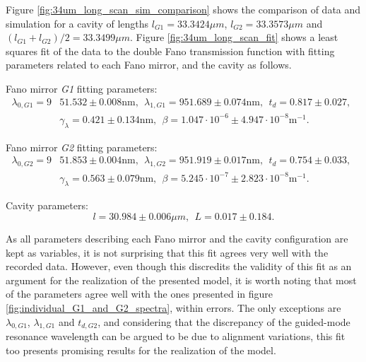 Figure \ref{fig:34um_long_scan_sim_comparison} shows the comparison of data and simulation for a cavity of lengths $l_{G1} = 33.3424 \mu m$, $l_{G2} = 33.3573 \mu m$ and $(l_{G1} + l_{G2})/2 = 33.3499 \mu m$. Figure \ref{fig:34um_long_scan_fit} shows a least squares fit of the data to the double Fano transmission function with fitting parameters related to each Fano mirror, and the cavity as follows.

Fano mirror \emph{G1} fitting parameters:
\begin{equation}
    \begin{split}
        \lambda_{0,G1} = 9&51.532 \pm 0.008 \text{nm}, \:\: \lambda_{1,G1} = 951.689 \pm 0.074 \text{nm}, \:\: t_d = 0.817 \pm 0.027, \:\: \\&\gamma_{\lambda} = 0.421 \pm 0.134 \text{nm}, \:\: \beta = 1.047 \cdot 10^{-6} \pm 4.947 \cdot 10^{-8} \text{m}^{-1}.
    \end{split}
\end{equation}

Fano mirror \emph{G2} fitting parameters:
\begin{equation}
    \begin{split}
        \lambda_{0,G2} = 9&51.853 \pm 0.004 \text{nm}, \:\: \lambda_{1,G2} = 951.919 \pm 0.017 \text{nm}, \:\: t_d = 0.754 \pm 0.033, \:\: \\&\gamma_{\lambda} = 0.563 \pm 0.079 \text{nm}, \:\: \beta = 5.245 \cdot 10^{-7} \pm 2.823 \cdot 10^{-8} \text{m}^{-1}.
    \end{split}
\end{equation}

Cavity parameters:
\begin{equation}
    l = 30.984 \pm 0.006 \mu m, \:\: L = 0.017 \pm 0.184.
\end{equation}

As all parameters describing each Fano mirror and the cavity configuration are kept as variables, it is not surprising that this fit agrees very well with the recorded data. However, even though this discredits the validity of this fit as an argument for the realization of the presented model, it is worth noting that most of the parameters agree well with the ones presented in figure \ref{fig:individual_G1_and_G2_spectra}, within errors. The only exceptions are $\lambda_{0,G1}$, $\lambda_{1,G1}$ and $t_{d,G2}$, and considering that the discrepancy of the guided-mode resonance wavelength can be argued to be due to alignment variations, this fit too presents promising results for the realization of the model.

